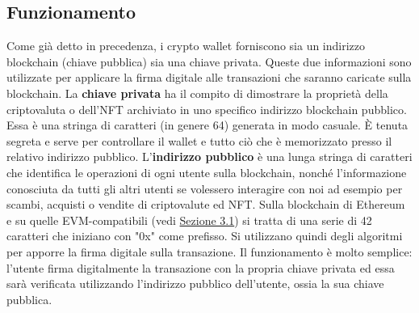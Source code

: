 \documentclass[12pt]{report}
\begin{document}
\subsection{Funzionamento}
Come già detto in precedenza, i crypto wallet forniscono sia un indirizzo blockchain (chiave pubblica) sia una chiave privata. Queste due informazioni sono utilizzate per applicare la firma digitale alle transazioni che saranno caricate sulla blockchain.\newline\newline
La \textbf{chiave privata} ha il compito di dimostrare la proprietà della criptovaluta o dell'NFT archiviato in uno specifico indirizzo blockchain pubblico.\newline
Essa è una stringa di caratteri (in genere 64) generata in modo casuale. È tenuta segreta e serve per controllare il wallet e tutto ciò che è memorizzato presso il relativo indirizzo pubblico.\newline\newline
L'\textbf{indirizzo pubblico} è una lunga stringa di caratteri che identifica le operazioni di ogni utente sulla blockchain, nonché l'informazione conosciuta da tutti gli altri utenti se volessero interagire con noi ad esempio per scambi, acquisti o vendite di criptovalute ed NFT.\newline
Sulla blockchain di Ethereum e su quelle EVM-compatibili (vedi \hyperref[sec:EVM]{Sezione 3.1}) si tratta di una serie di 42 caratteri che iniziano con "0x" come prefisso.\newline\newline
Si utilizzano quindi degli algoritmi per apporre la firma digitale sulla transazione.\newline
Il funzionamento è molto semplice: l'utente firma digitalmente la transazione con la propria chiave privata ed essa sarà verificata utilizzando l'indirizzo pubblico dell'utente, ossia la sua chiave pubblica. \cite{Otto} \newpage
\end{document}
